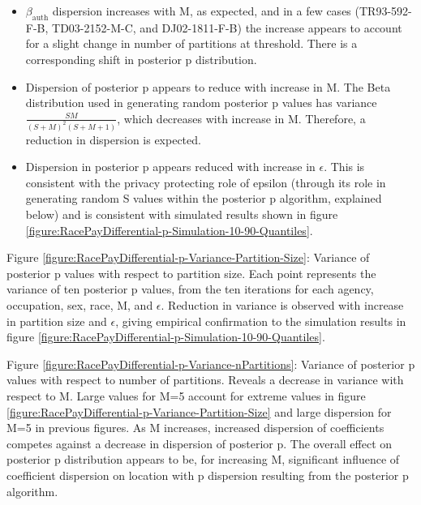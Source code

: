 \documentclass[10pt, letterpaper]{article}
\begin{document}
\begin{spacing}{1.0}
\begin{itemize}
    \item $\beta_\text{auth}$ dispersion increases with M, as expected, and in a few cases (TR93-592-F-B, TD03-2152-M-C, and DJ02-1811-F-B) the increase appears to account for a slight change in number of partitions at threshold.  There is a corresponding shift in posterior p distribution.
    
    \item Dispersion of posterior p appears to reduce with increase in M.  The Beta distribution used in generating random posterior p values has variance $\frac{SM}{(S+M)^2(S+M+1)}$, which decreases with increase in M.  Therefore, a reduction in dispersion is expected.
    
    \item Dispersion in posterior p appears reduced with increase in $\epsilon$.  This is consistent with the privacy protecting role of epsilon (through its role in generating random S values within the posterior p algorithm, explained below) and is consistent with simulated results shown in figure \ref{figure:RacePayDifferential-p-Simulation-10-90-Quantiles}. 
\end{itemize}

\vspace{12pt}

Figure \ref{figure:RacePayDifferential-p-Variance-Partition-Size}:  Variance of posterior p values with respect to partition size.  Each point represents the variance of ten posterior p values, from the ten iterations for each agency, occupation, sex, race, M, and $\epsilon$.  Reduction in variance is observed with increase in partition size and $\epsilon$, giving empirical confirmation to the simulation results in figure \ref{figure:RacePayDifferential-p-Simulation-10-90-Quantiles}.

\vspace{12pt}

Figure \ref{figure:RacePayDifferential-p-Variance-nPartitions}:  Variance of posterior p values with respect to number of partitions.  Reveals a decrease in variance with respect to M.  Large values for M=5 account for extreme values in figure \ref{figure:RacePayDifferential-p-Variance-Partition-Size} and large dispersion for M=5 in previous figures.  As M increases, increased dispersion of coefficients competes against a decrease in dispersion of posterior p.  The overall effect on posterior p distribution appears to be, for increasing M, significant influence of coefficient dispersion on location with p dispersion resulting from the posterior p algorithm.   


\end{spacing}
\end{document}
